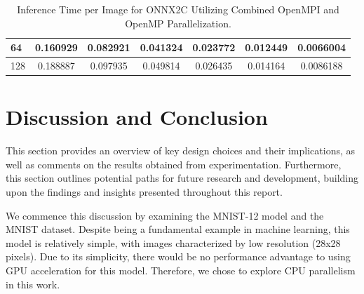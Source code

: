 \documentclass[fleqn,10pt]{olplainarticle}
\begin{document}
\begin{table}[!ht]
\begin{tabular}{l|cccccc|}
    \multicolumn{1}{|l|}{64}                                                                           & \multicolumn{1}{c|}{0.160929}                                                            & \multicolumn{1}{c|}{0.082921}                                                            & \multicolumn{1}{c|}{0.041324}                                                            & \multicolumn{1}{c|}{0.023772}                                                             & \multicolumn{1}{c|}{0.012449}                                                             & 0.0066004                                                            \\ \hline
    \multicolumn{1}{|l|}{128}                                                                          & \multicolumn{1}{c|}{0.188887}                                                            & \multicolumn{1}{c|}{0.097935}                                                            & \multicolumn{1}{c|}{0.049814}                                                            & \multicolumn{1}{c|}{0.026435}                                                             & \multicolumn{1}{c|}{0.014164}                                                             & 0.0086188                                                            \\ \hline
    \end{tabular}
    \caption{Inference Time per Image for ONNX2C Utilizing Combined OpenMPI and OpenMP Parallelization.}
    \label{tab:onnx2c_mpi_omp}
\end{table}


\section{Discussion and Conclusion}
This section provides an overview of key design choices and their implications, as well as comments on the results obtained from experimentation. Furthermore, this section outlines potential paths for future research and development, building upon the findings and insights presented throughout this report.

We commence this discussion by examining the MNIST-12 model and the MNIST dataset. Despite being a fundamental example in machine learning, this model is relatively simple, with images characterized by low resolution (28x28 pixels). Due to its simplicity, there would be no performance advantage to using GPU acceleration for this model. Therefore, we chose to explore CPU parallelism in this work.
\end{document}
